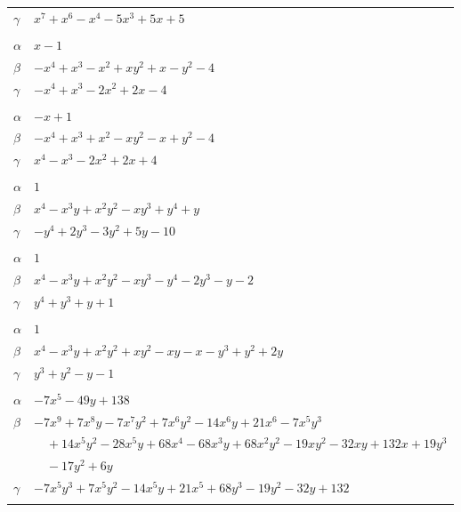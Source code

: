 \documentclass[11pt]{article}
\begin{document}
\begin{longtable}{@{}ll@{}}
$\gamma$ & $x^{7}+x^{6}-x^{4}-5x^{3}+5x+5$\\
\addlinespace[3pt]
\multicolumn{2}{@{}l}{$\{i,j\}=\{0,27\}$, $k_{ij}=2^{2}$}\\
$\alpha$ & $x-1$\\
$\beta$ & $-x^{4}+x^{3}-x^{2}+xy^{2}+x-y^{2}-4$\\
$\gamma$ & $-x^{4}+x^{3}-2x^{2}+2x-4$\\
\addlinespace[3pt]
\multicolumn{2}{@{}l}{$\{i,j\}=\{0,33\}$, $k_{ij}=2^{2}\cdot 3$}\\
$\alpha$ & $-x+1$\\
$\beta$ & $-x^{4}+x^{3}+x^{2}-xy^{2}-x+y^{2}-4$\\
$\gamma$ & $x^{4}-x^{3}-2x^{2}+2x+4$\\
\addlinespace[3pt]
\multicolumn{2}{@{}l}{$\{i,j\}=\{1,8\}$, $k_{ij}=2^{3}\cdot 3$}\\
$\alpha$ & $1$\\
$\beta$ & $x^{4}-x^{3}y+x^{2}y^{2}-xy^{3}+y^{4}+y$\\
$\gamma$ & $-y^{4}+2y^{3}-3y^{2}+5y-10$\\
\addlinespace[3pt]
\multicolumn{2}{@{}l}{$\{i,j\}=\{1,12\}$, $k_{ij}=3$}\\
$\alpha$ & $1$\\
$\beta$ & $x^{4}-x^{3}y+x^{2}y^{2}-xy^{3}-y^{4}-2y^{3}-y-2$\\
$\gamma$ & $y^{4}+y^{3}+y+1$\\
\addlinespace[3pt]
\multicolumn{2}{@{}l}{$\{i,j\}=\{1,24\}$, $k_{ij}=3$}\\
$\alpha$ & $1$\\
$\beta$ & $x^{4}-x^{3}y+x^{2}y^{2}+xy^{2}-xy-x-y^{3}+y^{2}+2y$\\
$\gamma$ & $y^{3}+y^{2}-y-1$\\
\addlinespace[3pt]
\multicolumn{2}{@{}l}{$\{i,j\}=\{1,27\}$, $k_{ij}=2^{5}\cdot 3^{2}$}\\
$\alpha$ & $-7x^{5}-49y+138$\\
$\beta$ & $-7x^{9}+7x^{8}y-7x^{7}y^{2}+7x^{6}y^{2}-14x^{6}y+21x^{6}-7x^{5}y^{3}$\\
 & $\quad +14x^{5}y^{2}-28x^{5}y+68x^{4}-68x^{3}y+68x^{2}y^{2}-19xy^{2}-32xy+132x+19y^{3}$\\
 & $\quad -17y^{2}+6y$\\
$\gamma$ & $-7x^{5}y^{3}+7x^{5}y^{2}-14x^{5}y+21x^{5}+68y^{3}-19y^{2}-32y+132$\\
\addlinespace[3pt]
\multicolumn{2}{@{}l}{$\{i,j\}=\{1,32\}$, $k_{ij}=2^{4}\cdot 3$}\\

\end{longtable}
\end{document}

